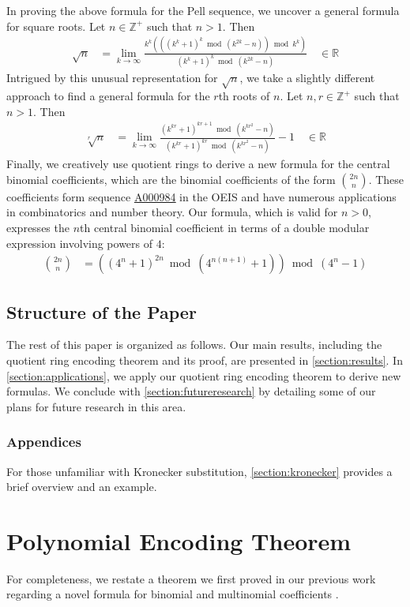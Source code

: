 \documentclass[11pt,reqno]{article}
\theoremstyle{plain}
\theoremstyle{definition}
\newcommand{\seqnum}[1]{\href{https://oeis.org/#1}{\rm \underline{#1}}}
\begin{document}
In proving the above formula for the Pell sequence, we uncover a general formula for square roots. Let $n \in \mathbb{Z}^+$ such that $n > 1$. Then
\begin{align*}
\sqrt{n} &= \lim_{k\rightarrow\infty}
    \frac{k^k (((k^k + 1)^k \bmod{(k^{2k}-n)}) \bmod{k^k})}
        {(k^k + 1)^k \bmod{(k^{2k}-n)}} \quad \in \mathbb{R}
\end{align*}
Intrigued by this unusual representation for $\sqrt{n}$, we take a slightly different approach to find a general formula for the $r$th roots of $n$. Let $n,r \in \mathbb{Z}^+$ such that $n > 1$. Then
\begin{align*}
\sqrt[r]{n} &= \lim_{k\rightarrow\infty}
    \frac{(k^{kr} + 1)^{kr+1} \bmod{(k^{kr^2}-n)}}
    {(k^{kr} + 1)^{kr} \bmod{ (k^{kr^2}-n)}} - 1  \quad \in \mathbb{R}
\end{align*}
Finally, we creatively use quotient rings to derive a new formula for the central binomial coefficients, which are the binomial coefficients of the form $\binom{2n}{n}$. These coefficients form sequence \seqnum{A000984} in the OEIS \cite{A000984} and have numerous applications in combinatorics and number theory. Our formula, which is valid for $n > 0$, expresses the $n$th central binomial coefficient in terms of a double modular expression involving powers of $4$:
\begin{align*}
    \binom{2n}{n} &= ((4^n + 1)^{2n} \bmod{(4^{n(n+1)} + 1)}) \bmod{(4^n-1)}
\end{align*}

\subsection{Structure of the Paper}
The rest of this paper is organized as follows.  Our main results, including the quotient ring encoding theorem and its proof, are presented in \cref{section:results}. In \cref{section:applications}, we apply our quotient ring encoding theorem to derive new formulas. We conclude with \cref{section:futureresearch} by detailing some of our plans for future research in this area.

\subsubsection{Appendices}
For those unfamiliar with Kronecker substitution, \cref{section:kronecker} provides a brief overview and an example.

\section{Polynomial Encoding Theorem}
For completeness, we restate a theorem we first proved in our previous work regarding a novel formula for binomial and multinomial coefficients \cite{shunia2023simple}.
\end{document}
